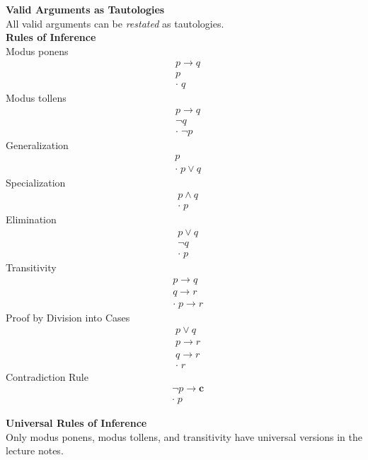 \documentclass[a4paper]{article}
\newcommand{\subheading}[1]{{\scriptsize\textbf{#1}}}
\begin{document}
\begin{multicols*}{4}
\subheading{Valid Arguments as Tautologies}\\
All valid arguments can be \textit{restated} as tautologies.\\

\subheading{Rules of Inference}\\
Modus ponens
\begin{eqnarray*}
  &p \rightarrow q \\
  &p \\
  &\boldsymbol{\cdot}\; q
\end{eqnarray*}
Modus tollens
\begin{eqnarray*}
  &p \rightarrow q \\
  &\neg q \\
  &\boldsymbol{\cdot}\; \neg p
\end{eqnarray*}
Generalization
\begin{eqnarray*}
  &p\\
  &\boldsymbol{\cdot}\; p \lor q
\end{eqnarray*}
Specialization
\begin{eqnarray*}
  &p \land q\\
  &\boldsymbol{\cdot}\; p
\end{eqnarray*}
Elimination
\begin{eqnarray*}
  &p \lor q\\
  &\neg q\\
  &\boldsymbol{\cdot}\; p
\end{eqnarray*}
Transitivity
\begin{eqnarray*}
  &p \rightarrow q\\
  &q \rightarrow r\\
  &\boldsymbol{\cdot}\; p \rightarrow r
\end{eqnarray*}
Proof by Division into Cases
\begin{eqnarray*}
  &p \lor q\\
  &p \rightarrow r\\
  &q \rightarrow r\\
  &\boldsymbol{\cdot}\; r
\end{eqnarray*}
Contradiction Rule
\begin{eqnarray*}
  &\neg p \rightarrow \textbf{c}\\
  &\boldsymbol{\cdot}\; p
\end{eqnarray*}

\subheading{Universal Rules of Inference}\\
Only modus ponens, modus tollens, and transitivity have universal versions in
the lecture notes.\\


\end{multicols*}
\end{document}
